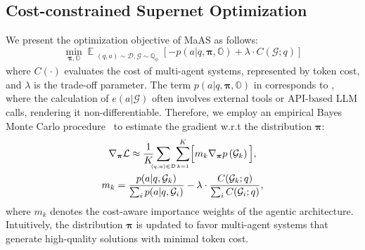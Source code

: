 \documentclass{article}
\theoremstyle{plain}
\theoremstyle{definition}
\theoremstyle{remark}
\newcommand{\ourmethod}{{{MaAS}}\xspace}
\begin{document}
\vspace{-0.5em}
\subsection{Cost-constrained Supernet Optimization}\label{sec:gradient-update}
\vspace{-0.5em}

We present the optimization objective of \ourmethod as follows:
\begin{equation}\label{eq:objective}
\underset{\boldsymbol{\pi},\mathbb{O}}{\min} \;\mathbb{E}_{\substack{(q,a)\sim \mathcal{D}, \mathcal{G}\sim\mathbb{Q}_\phi}} \left[-p(a | q, \boldsymbol{\pi}, \mathbb{O}) + \lambda\cdot C(\mathcal{G};q)\right]
\end{equation}
where \(C(\cdot)\) evaluates the cost of multi-agent systems, represented by token cost, and \(\lambda\) is the trade-off parameter. The term \(p(a | q, \boldsymbol{\pi}, \mathbb{O})\) in  corresponds to , where the calculation of \(e(a | \mathcal{G})\) often involves external tools or API-based LLM calls, rendering it non-differentiable. Therefore, we employ an empirical Bayes Monte Carlo procedure~\citep{carlin2000empirical,yan2021fpnas} to estimate the gradient w.r.t the distribution \(\boldsymbol{\pi}\):
\begin{equation}
\label{eq:loss-pi}
\begin{gathered}
\nabla_{\boldsymbol{\pi}}\mathcal{L} \approx \frac{1}{K}\!\!\!\sum_{\scriptscriptstyle(q,a)\in\mathcal{D}}\!\sum_{\scriptscriptstyle k=1}^K\Bigl[m_k\nabla_{\boldsymbol{\pi}}p\left(\mathcal{G}_k\right)\Bigl],\\
m_k=\frac{p(a | q, \mathcal{G}_k)}{\sum_i p(a | q, \mathcal{G}_i)} - \lambda\cdot \frac{C(\mathcal{G}_k;q)}{\sum_i C(\mathcal{G}_i;q)},
\end{gathered}
\end{equation}
where \(m_k\) denotes the cost-aware importance weights of the agentic architecture. Intuitively, the distribution \(\boldsymbol{\pi}\) is updated to favor multi-agent systems that generate high-quality solutions with minimal token cost. 
\end{document}
